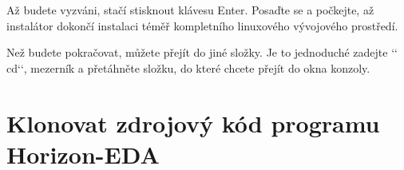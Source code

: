 \documentclass[letterpaper,10pt,czech]{sphinxmanual}
\begin{document}
\begin{sphinxVerbatim}[commandchars=\\\{\}]
     \PYGZbs{}
  \PYGZbs{}
  \PYGZbs{}
   \PYGZbs{}
  \PYGZbs{}
 
\end{sphinxVerbatim}

Až budete vyzváni, stačí stisknout klávesu Enter. Posaďte se a počkejte, až instalátor dokončí
instalaci téměř kompletního linuxového vývojového prostředí.

Než budete pokračovat, můžete přejít do jiné složky. Je to jednoduché
zadejte {}`{}` cd{}`{}`, mezerník a přetáhněte složku, do které chcete přejít
do okna konzoly.


\section{Klonovat zdrojový kód programu Horizon-EDA}
\label{\detokenize{build-win32:klonovat-zdrojovy-kod-programu-horizon-eda}}
\begin{sphinxVerbatim}[commandchars=\\\{\}]
  
 
\end{sphinxVerbatim}
\end{document}
